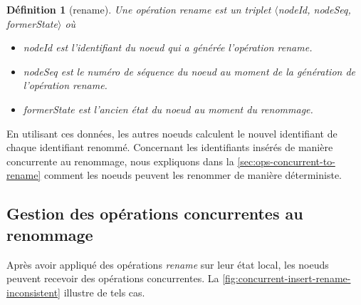 \documentclass[12pt]{thesul}
\newtheorem{definition}{Définition}
\begin{document}
\begin{definition}[rename]
  \label{def:rename-op}
  Une opération \emph{rename} est un triplet $\langle$nodeId, nodeSeq, formerState$\rangle$ où
  \begin{itemize}
    \item nodeId est l'identifiant du noeud qui a générée l'opération \emph{rename}.
    \item nodeSeq est le numéro de séquence du noeud au moment de la génération de l'opération \emph{rename}.
    \item formerState est l'ancien état du noeud au moment du renommage.
  \end{itemize}
\end{definition}

En utilisant ces données, les autres noeuds calculent le nouvel identifiant de chaque identifiant renommé.
Concernant les identifiants insérés de manière concurrente au renommage, nous expliquons dans la \autoref{sec:ops-concurrent-to-rename} comment les noeuds peuvent les renommer de manière déterministe.

\subsection{Gestion des opérations concurrentes au renommage}

\label{sec:ops-concurrent-to-rename}

Après avoir appliqué des opérations \emph{rename} sur leur état local, les noeuds peuvent recevoir des opérations concurrentes.
La \autoref{fig:concurrent-insert-rename-inconsistent} illustre de tels cas.
\end{document}
